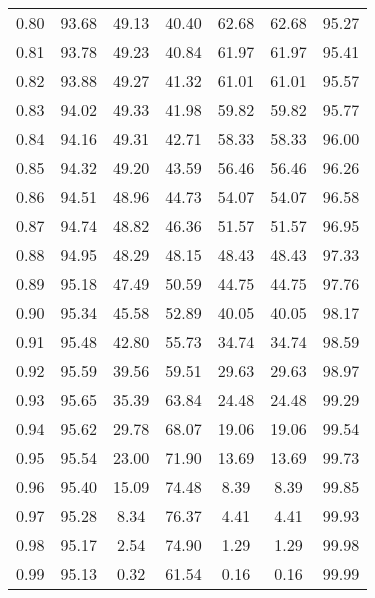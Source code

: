 \begin{tabular}{|c|c|c|c|c|c|c|}
      0.80 &     93.68 &     49.13 &      40.40 &   62.68 &      62.68 &         95.27 \\
      0.81 &     93.78 &     49.23 &      40.84 &   61.97 &      61.97 &         95.41 \\
      0.82 &     93.88 &     49.27 &      41.32 &   61.01 &      61.01 &         95.57 \\
      0.83 &     94.02 &     49.33 &      41.98 &   59.82 &      59.82 &         95.77 \\
      0.84 &     94.16 &     49.31 &      42.71 &   58.33 &      58.33 &         96.00 \\
      0.85 &     94.32 &     49.20 &      43.59 &   56.46 &      56.46 &         96.26 \\
      0.86 &     94.51 &     48.96 &      44.73 &   54.07 &      54.07 &         96.58 \\
      0.87 &     94.74 &     48.82 &      46.36 &   51.57 &      51.57 &         96.95 \\
      0.88 &     94.95 &     48.29 &      48.15 &   48.43 &      48.43 &         97.33 \\
      0.89 &     95.18 &     47.49 &      50.59 &   44.75 &      44.75 &         97.76 \\
      0.90 &     95.34 &     45.58 &      52.89 &   40.05 &      40.05 &         98.17 \\
      0.91 &     95.48 &     42.80 &      55.73 &   34.74 &      34.74 &         98.59 \\
      0.92 &     95.59 &     39.56 &      59.51 &   29.63 &      29.63 &         98.97 \\
      0.93 &     95.65 &     35.39 &      63.84 &   24.48 &      24.48 &         99.29 \\
      0.94 &     95.62 &     29.78 &      68.07 &   19.06 &      19.06 &         99.54 \\
      0.95 &     95.54 &     23.00 &      71.90 &   13.69 &      13.69 &         99.73 \\
      0.96 &     95.40 &     15.09 &      74.48 &    8.39 &       8.39 &         99.85 \\
      0.97 &     95.28 &      8.34 &      76.37 &    4.41 &       4.41 &         99.93 \\
      0.98 &     95.17 &      2.54 &      74.90 &    1.29 &       1.29 &         99.98 \\
      0.99 &     95.13 &      0.32 &      61.54 &    0.16 &       0.16 &         99.99 \\
\bottomrule
\end{tabular}
